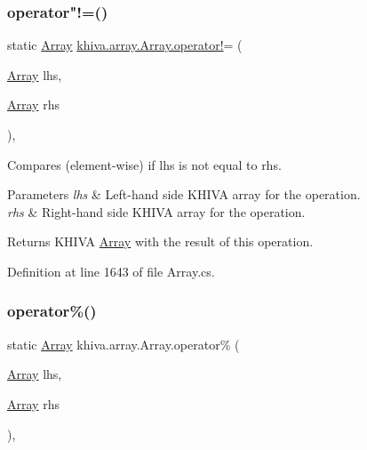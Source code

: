 \subsubsection{\texorpdfstring{operator"!=()}{operator!=()}}
{\footnotesize\ttfamily static \mbox{\hyperlink{classkhiva_1_1array_1_1_array}{Array}} \mbox{\hyperlink{classkhiva_1_1array_1_1_array_a49651c727023f9b2160bc32265c37394}{khiva.\+array.\+Array.\+operator!}}= (\begin{DoxyParamCaption}\item[{\mbox{\hyperlink{classkhiva_1_1array_1_1_array}{Array}}}]{lhs,  }\item[{\mbox{\hyperlink{classkhiva_1_1array_1_1_array}{Array}}}]{rhs }\end{DoxyParamCaption})\hspace{0.3cm}{\ttfamily [inline]}, {\ttfamily [static]}}



Compares (element-\/wise) if lhs is not equal to rhs. 


\begin{DoxyParams}{Parameters}
{\em lhs} & Left-\/hand side K\+H\+I\+VA array for the operation.\\
\hline
{\em rhs} & Right-\/hand side K\+H\+I\+VA array for the operation.\\
\hline
\end{DoxyParams}
\begin{DoxyReturn}{Returns}
K\+H\+I\+VA \mbox{\hyperlink{classkhiva_1_1array_1_1_array}{Array}} with the result of this operation.
\end{DoxyReturn}


Definition at line 1643 of file Array.\+cs.

\mbox{\label{classkhiva_1_1array_1_1_array_ad68751be70f9242bfcc539143c6690b8}} 
\subsubsection{\texorpdfstring{operator\%()}{operator\%()}}
{\footnotesize\ttfamily static \mbox{\hyperlink{classkhiva_1_1array_1_1_array}{Array}} khiva.\+array.\+Array.\+operator\% (\begin{DoxyParamCaption}\item[{\mbox{\hyperlink{classkhiva_1_1array_1_1_array}{Array}}}]{lhs,  }\item[{\mbox{\hyperlink{classkhiva_1_1array_1_1_array}{Array}}}]{rhs }\end{DoxyParamCaption})\hspace{0.3cm}{\ttfamily [inline]}, {\ttfamily [static]}}



